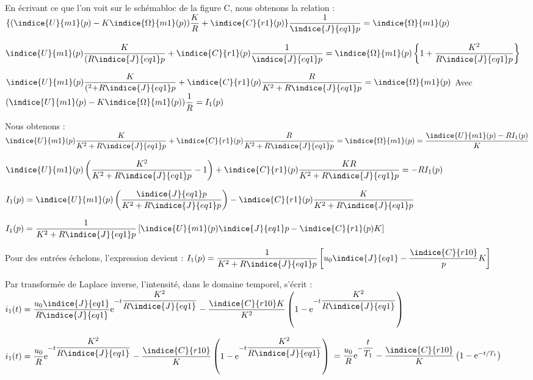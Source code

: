 \ifprof
\begin{corrige}
En écrivant ce que l’on voit sur le schémabloc de la figure C, nous obtenons la relation :
$\{(\indice{U}{m1}  (p)-K  \indice{\Omega}{m1}  (p)) \dfrac{K}{R}+\indice{C}{r1} (p)\}  \dfrac{1}{\indice{J}{eq1}  p}=\indice{\Omega}{m1} (p)$

$\indice{U}{m1}  (p)   \dfrac{K}{(R  \indice{J}{eq1}   p}+\indice{C}{r1} (p) \dfrac{1}{\indice{J}{eq1} p}=\indice{\Omega}{m1} (p) \left\{1+\dfrac{K^2}{R \indice{J}{eq1}  p}\right\}$

$\indice{U}{m1}  (p)  \dfrac{K}{(^2+R \indice{J}{eq1}   p}+\indice{C}{r1} (p)   \dfrac{R}{K^2+R  \indice{J}{eq1}  p}=\indice{\Omega}{m1} (p)$
    Avec $(\indice{U}{m1}  (p)-K  \indice{\Omega}{m1}  (p))  \dfrac{1}{R}=I_1 (p)$

Nous obtenons : 
$\indice{U}{m1}  (p) \dfrac{K}{K^2+R  \indice{J}{eq1}  p}+\indice{C}{r1} (p)\dfrac{R}{K^2+R \indice{J}{eq1}  p}=\indice{\Omega}{m1} (p)=\dfrac{\indice{U}{m1}  (p)-R I_1 (p)}{K}$

$\indice{U}{m1}  (p)  \left(\dfrac{K^2}{K^2+R  \indice{J}{eq1}   p }-1\right)+\indice{C}{r1} (p) \dfrac{KR}{K^2+R \indice{J}{eq1}  p}=-R  I_1 (p)$

$I_1 (p)=\indice{U}{m1}  (p) \left( \dfrac{\indice{J}{eq1}p}{K^2+R  \indice{J}{eq1}  p}\right)-\indice{C}{r1} (p) \dfrac{K}{K^2+R \indice{J}{eq1}p}$

$I_1 (p)=\dfrac{1}{K^2+R \indice{J}{eq1}  p} \left[\indice{U}{m1}  (p)  \indice{J}{eq1}  p-\indice{C}{r1} (p) K\right]$

Pour des entrées échelons, l’expression devient : $I_1 (p)=\dfrac{1}{K^2+R \indice{J}{eq1}  p}  \left[u_0  \indice{J}{eq1}-\dfrac{\indice{C}{r10}}{p}  K\right]$

Par transformée de Laplace inverse, l’intensité, dans le domaine temporel, s’écrit :
$i_1 (t)=\dfrac{u_0  \indice{J}{eq1}}{R  \indice{J}{eq1} } \text{e}^{-t  \dfrac{K^2}{R  \indice{J}{eq1} }}-\dfrac{\indice{C}{r10}  K}{K^2}    \left(1-\text{e}^{-t  \dfrac{K^2}{R  \indice{J}{eq1}}} \right)$

$i_1 (t)=\dfrac{u_0}{R} \text{e}^{-t \dfrac{K^2}{R  \indice{J}{eq1}}}-\dfrac{\indice{C}{r10}}{K}   \left(1- \text{e}^{-t\dfrac{K^2}{R  \indice{J}{eq1} }}\right)$
$=\dfrac{u_0}{R}  \text{e}^{-\dfrac{t}{T_1}}-\dfrac{\indice{C}{r10}}{K}  \left(1- \text{e}^{-t /T_1}\right )$

%
%
\end{corrige}
\else
\fi


